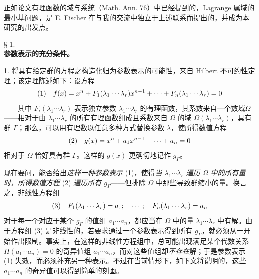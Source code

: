 正如论文\glqq{}有理函数的域与系统\grqq{}（Math. Ann. 76）中已经提到的，Lagrange 属域的最小基问题，是 E. Fischer 在与我的交流中独立于上述联系而提出的，并成为本研究的出发点。

\begin{center}
§ 1.\\[0.75em]
\textbf{参数表示的充分条件。}
\end{center}

1. 将具有给定群的方程之构造化归为参数表示的可能性，来自 Hilbert 不可约性定理；该定理陈述如下：设方程
\[
\begin{array}{@{}l@{\quad}l@{}}
(1)& \displaystyle f(x)=x^n+F_1(\lambda_1\cdots\lambda_r)x^{n-1}+\cdots+F_n(\lambda_1\cdots\lambda_r)=0
\end{array}
\]
——其中 $F_i(\lambda_1\cdots\lambda_r)$ 表示独立参数 $\lambda_1\cdots\lambda_r$ 的有理函数，其系数来自一个数域$\Omega$——相对于由 $\lambda_1\cdots\lambda_r$ 的所有有理函数组成且系数来自 $\Omega$ 的域 $\Omega(\lambda_1\cdots\lambda_r)$，具有群 $\Gamma$；那么，可以用有理数以任意多种方式替换参数 $\lambda$，使所得数值方程
\[
\begin{array}{@{}l@{\quad}l@{}}
(2)& \displaystyle g(x)=x^n+a_1x^{n-1}+\cdots+a_n=0
\end{array}
\]
相对于 $\Omega$ 恰好具有群 $\Gamma$。这样的 $g(x)$ 更确切地记作 $g_\Gamma$。

现在要问，能否给出\emph{这样一种参数表示} (1)，使得\emph{当 $\lambda_1\cdots\lambda_r$ 遍历 $\Omega$ 中的所有量时，所得数值方程} (2) \emph{遍历所有 $g_\Gamma$}——但排除 $\Omega$ 中那些导致群缩小的量。换言之，非线性方程组
\[
\begin{array}{@{}l@{\quad}l@{}}
(3)& \displaystyle F_1(\lambda_1\cdots\lambda_r)=a_1;\quad \cdots;\quad F_n(\lambda_1\cdots\lambda_r)=a_n
\end{array}
\]
对于每一个对应于某个 $g_\Gamma$ 的值组 $a_1\cdots a_n$，都应当在 $\Omega$ 中的量 $\lambda_1\cdots\lambda_r$ 中有解。由于方程组 (3) 是非线性的，若要求通过一个参数表示得到所有 $g_\Gamma$，就必须从一开始作出限制。事实上，在这样的非线性方程组中，总可能出现满足某个代数关系 $H(a_1\cdots a_n)=0$ 的奇异值组 $a_1\cdots a_n$，而对这些值组却\emph{不存在}解；于是参数表示 (1) 失效，而必须补充另一种表示。不过在当前情形下，如下文将说明的，这些 $a_1\cdots a_n$ 的奇异值可以得到简单的刻画。

